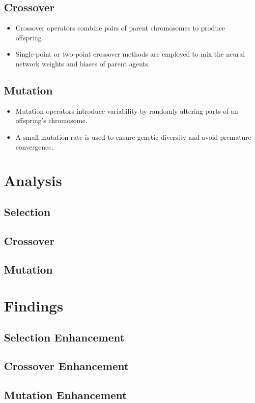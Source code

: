 \documentclass[a4paper, twocolumn]{article}
\begin{document}
\subsection{Crossover\label{sec:Crossover}}
 
\begin{itemize}
    \item Crossover operators combine pairs of parent chromosomes to produce offspring.
    \item Single-point or two-point crossover methods are employed to mix the neural network weights and biases of parent agents.
\end{itemize}
 
\subsection{Mutation\label{sec:Mutation}}
 
\begin{itemize}
    \item Mutation operators introduce variability by randomly altering parts of an offspring's chromosome.
    \item A small mutation rate is used to ensure genetic diversity and avoid premature convergence.
\end{itemize}
 
 
\section{Analysis\label{sec:Analysis}}
 
\subsection{Selection\label{sec:Selection}}
 
\subsection{Crossover\label{sec:Crossover}}
 
\subsection{Mutation\label{sec:Mutation}}
 
 
\section{Findings\label{sec:Findings}}
 
\subsection{Selection Enhancement\label{sec:Selection Enhancement}}
 
\subsection{Crossover Enhancement\label{sec:Crossover Enhancement}}
 
\subsection{Mutation Enhancement\label{sec:Mutation Enhancement}}
 
\printbibliography
 
\end{document}
